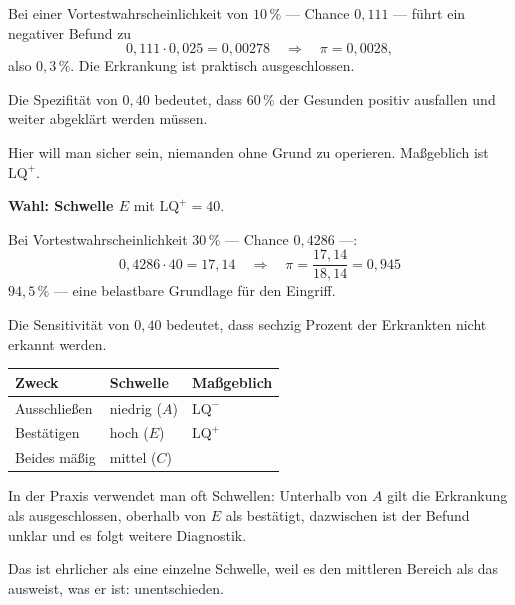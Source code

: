 \begin{aufgabe}
 Bei einer Vortestwahrscheinlichkeit von $10\,\%$ --- Chance $0{,}111$ --- führt ein negativer Befund zu
\[ 0{,}111 \cdot 0{,}025 = 0{,}00278 \quad\Longrightarrow\quad \pi = 0{,}0028 , \]
also $0{,}3\,\%$. Die Erkrankung ist praktisch ausgeschlossen.

 Die Spezifität von $0{,}40$ bedeutet, dass $60\,\%$ der Gesunden positiv ausfallen und weiter abgeklärt werden müssen.

Hier will man sicher sein, niemanden ohne Grund zu operieren. Maßgeblich ist $\mathrm{LQ}^{+}$.

\textbf{Wahl: Schwelle $E$} mit $\mathrm{LQ}^{+} = 40$.

 Bei Vortestwahrscheinlichkeit $30\,\%$ --- Chance $0{,}4286$ ---:
\[ 0{,}4286 \cdot 40 = 17{,}14 \quad\Longrightarrow\quad \pi = \frac{17{,}14}{18{,}14} = 0{,}945 \]
$94{,}5\,\%$ --- eine belastbare Grundlage für den Eingriff.

 Die Sensitivität von $0{,}40$ bedeutet, dass sechzig Prozent der Erkrankten nicht erkannt werden.

\begin{center}
\renewcommand{\arraystretch}{1.48}
\begin{tabular}{@{}P{2.6cm}P{2.4cm}P{2.8cm}@{}}
\toprule
\textbf{Zweck} & \textbf{Schwelle} & \textbf{Maßgeblich}\\
\midrule
Ausschließen & niedrig ($A$) & $\mathrm{LQ}^{-}$\\
Bestätigen & hoch ($E$) & $\mathrm{LQ}^{+}$\\
Beides mäßig & mittel ($C$) & \\
\bottomrule
\end{tabular}
\end{center}

\begin{center}
\begin{minipage}{0.86\textwidth}
\end{minipage}
\end{center}

In der Praxis verwendet man oft  Schwellen: Unterhalb von $A$ gilt die Erkrankung als ausgeschlossen, oberhalb von $E$ als bestätigt, dazwischen ist der Befund unklar und es folgt weitere Diagnostik.

Das ist ehrlicher als eine einzelne Schwelle, weil es den mittleren Bereich als das ausweist, was er ist: unentschieden.
\end{aufgabe}

